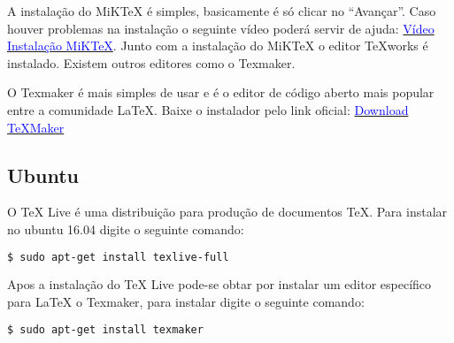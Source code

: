 A instalação do MiKTeX é simples, basicamente é só clicar no “Avançar”. Caso houver problemas na instalação o seguinte vídeo poderá servir de ajuda: \href{https://www.youtube.com/watch?v=4udFXbqtayE&list=LLQVoeslEpxQJ0UavpXUEkq}{\textcolor{blue}{Vídeo Instalação MiKTeX}}. Junto com a instalação do MiKTeX o editor TeXworks é instalado. Existem outros editores como o Texmaker. 

O Texmaker é mais simples de usar e é o editor de código aberto mais popular entre a comunidade LaTeX. Baixe o instalador pelo link oficial: \href{http://www.xm1math.net/texmaker/download.html}{\textcolor{blue}{Download TeXMaker}}

\subsection{Ubuntu}

O TeX Live é uma distribuição para produção de documentos \TeX \xspace. Para instalar no ubuntu 16.04 digite o seguinte comando: 
\begin{lstlisting}[language=bash]
  $ sudo apt-get install texlive-full
\end{lstlisting}

Apos a instalação do TeX Live pode-se obtar por instalar um editor específico para LaTeX o Texmaker, para instalar digite o seguinte comando: 

\begin{lstlisting}[language=bash]
  $ sudo apt-get install texmaker
\end{lstlisting}